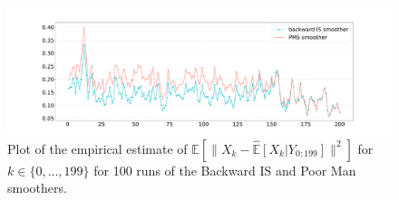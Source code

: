 \documentclass{article}
\begin{document}
\begin{figure}[h]
\begin{center}
    \includegraphics[width=\textwidth, trim = 1cm 1cm 1cm 1cm, clip]{RNN_dim64_mse_all_Xk.pdf}
\end{center}
    \caption{Plot of the empirical estimate of $\mathbb{E}[\|X_k - \mathbb{\widehat{E}}[X_k|Y_{0:199}]\|^2]$ for $k \in \{0,...,199\}$ for 100 runs of the Backward IS and Poor Man smoothers.}
    \label{fig:RNN:mseperXk}
\end{figure}
\end{document}

